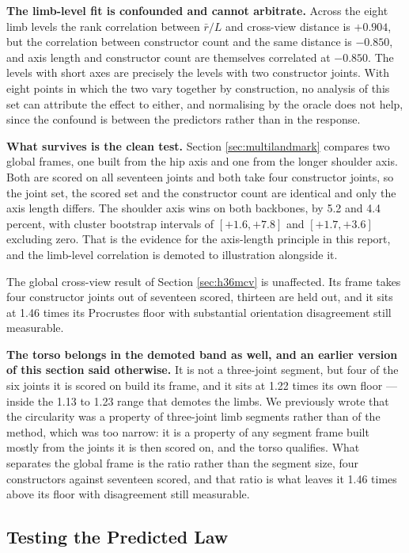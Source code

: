 \documentclass[12pt,a4paper]{report}
\begin{document}
\textbf{The limb-level fit is confounded and cannot arbitrate.} Across the eight limb levels the rank correlation between $\bar{r}/L$ and cross-view distance is $+0.904$, but the correlation between constructor count and the same distance is $-0.850$, and axis length and constructor count are themselves correlated at $-0.850$. The levels with short axes are precisely the levels with two constructor joints. With eight points in which the two vary together by construction, no analysis of this set can attribute the effect to either, and normalising by the oracle does not help, since the confound is between the predictors rather than in the response.

\textbf{What survives is the clean test.} Section \ref{sec:multilandmark} compares two global frames, one built from the hip axis and one from the longer shoulder axis. Both are scored on all seventeen joints and both take four constructor joints, so the joint set, the scored set and the constructor count are identical and only the axis length differs. The shoulder axis wins on both backbones, by 5.2 and 4.4 percent, with cluster bootstrap intervals of $[+1.6, +7.8]$ and $[+1.7, +3.6]$ excluding zero. That is the evidence for the axis-length principle in this report, and the limb-level correlation is demoted to illustration alongside it.

The global cross-view result of Section \ref{sec:h36mcv} is unaffected. Its frame takes four constructor joints out of seventeen scored, thirteen are held out, and it sits at 1.46 times its Procrustes floor with substantial orientation disagreement still measurable.

\textbf{The torso belongs in the demoted band as well, and an earlier version of this section said otherwise.} It is not a three-joint segment, but four of the six joints it is scored on build its frame, and it sits at 1.22 times its own floor --- inside the 1.13 to 1.23 range that demotes the limbs. We previously wrote that the circularity was a property of three-joint limb segments rather than of the method, which was too narrow: it is a property of any segment frame built mostly from the joints it is then scored on, and the torso qualifies. What separates the global frame is the ratio rather than the segment size, four constructors against seventeen scored, and that ratio is what leaves it 1.46 times above its floor with disagreement still measurable.

\subsection{Testing the Predicted Law}
\end{document}
